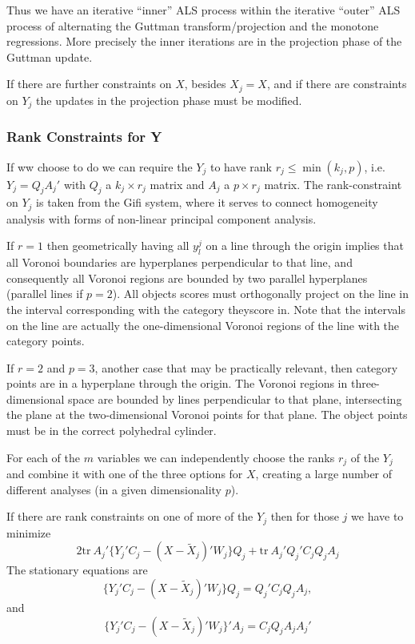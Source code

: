 \documentclass[
  12pt,
  letterpaper,
  DIV=11,
  numbers=noendperiod]{scrartcl}
\begin{document}
Thus we have an iterative ``inner'' ALS process within the iterative
``outer'' ALS process of alternating the Guttman transform/projection
and the monotone regressions. More precisely the inner iterations are in
the projection phase of the Guttman update.

If there are further constraints on \(X\), besides \(X_j=X\), and if
there are constraints on \(Y_j\) the updates in the projection phase
must be modified.

\subsubsection{Rank Constraints for Y}\label{rank-constraints-for-y}

If ww choose to do we can require the \(Y_j\) to have rank
\(r_j\leq\min(k_j,p)\), i.e.~\(Y_j=Q_jA_j'\) with \(Q_j\) a
\(k_j\times r_j\) matrix and \(A_j\) a \(p\times r_j\) matrix. The
rank-constraint on \(Y_j\) is taken from the Gifi system, where it
serves to connect homogeneity analysis with forms of non-linear
principal component analysis.

If \(r=1\) then geometrically having all \(y_l^j\) on a line through the
origin implies that all Voronoi boundaries are hyperplanes perpendicular
to that line, and consequently all Voronoi regions are bounded by two
parallel hyperplanes (parallel lines if \(p=2\)). All objects scores
must orthogonally project on the line in the interval corresponding with
the category theyscore in. Note that the intervals on the line are
actually the one-dimensional Voronoi regions of the line with the
category points.

If \(r=2\) and \(p=3\), another case that may be practically relevant,
then category points are in a hyperplane through the origin. The Voronoi
regions in three-dimensional space are bounded by lines perpendicular to
that plane, intersecting the plane at the two-dimensional Voronoi points
for that plane. The object points must be in the correct polyhedral
cylinder.

For each of the \(m\) variables we can independently choose the ranks
\(r_j\) of the \(Y_j\) and combine it with one of the three options for
\(X\), creating a large number of different analyses (in a given
dimensionality \(p\)).

If there are rank constraints on one of more of the \(Y_j\) then for
those \(j\) we have to minimize \[
2\text{tr}\ A_j'\{Y_j'C_j-(X-\tilde X_j)'W_j\}Q_j+
\text{tr}\ A_j'Q_j'C_jQ_jA_j
\] The stationary equations are \[
\{Y_j'C_j-(X-\tilde X_j)'W_j\}Q_j=Q_j'C_jQ_jA_j,
\] and \[
\{Y_j'C_j-(X-\tilde X_j)'W_j\}'A_j=C_jQ_jA_jA_j'
\]
\end{document}
